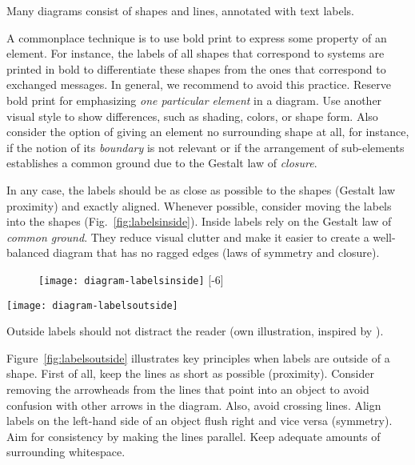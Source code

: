 Many diagrams consist of shapes and lines, annotated with text labels.

A commonplace technique is to use bold print to express some property of an element. For instance, the labels of all shapes that correspond to systems are printed in bold to differentiate these shapes from the ones that correspond to exchanged  messages. In general, we recommend to avoid this practice. Reserve bold print for emphasizing \emph{one particular element} in a diagram. Use another visual style to show differences, such as shading, colors, or shape form. Also consider the option of giving an element no surrounding shape at all, for instance, if the notion of its \emph{boundary} is not relevant or if the arrangement of sub-elements establishes a common ground due to the Gestalt law of \emph{closure}.

In any case, the labels should be as close as possible to the shapes (Gestalt law proximity) and exactly aligned. Whenever possible, consider moving the labels into the shapes (Fig.~\ref{fig:labelsinside}). Inside labels rely on the Gestalt law of \emph{common ground}. They reduce visual clutter and make it easier to create a well-balanced diagram that has no ragged edges (laws of symmetry and closure). 

\begin{figure}[t]
\centering
\texttt{[image: diagram-labelsinside]}
[-6\baselineskip]
\end{figure}

\begin{marginfigure}
\centering
\texttt{[image: diagram-labelsoutside]}
\caption{\label{fig:labelsoutside} Outside labels should not distract the reader (own illustration, inspired by \cite{Carter12}).}%
\end{marginfigure}

Figure~\ref{fig:labelsoutside} illustrates key principles when labels are outside of a shape. First of all, keep the lines as short as possible (proximity). Consider removing the arrowheads from the lines that point into an object to avoid confusion with other arrows in the diagram. Also, avoid crossing lines. Align labels on the left-hand side of an object flush right and vice versa (symmetry). Aim for consistency by making the lines parallel. Keep adequate amounts of surrounding whitespace.

